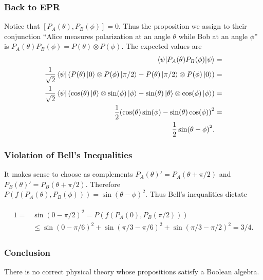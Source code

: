 \documentclass{beamer}
\begin{document}
\begin{frame}

	\frametitle{Back to EPR}
	
	Notice that $[P_A(\theta),P_B(\phi)]=0$. Thus the proposition we assign to their conjunction ``Alice measures polarization at an angle $\theta$ while Bob at an angle $\phi$'' is $P_A(\theta)P_B(\phi)=P(\theta)\otimes P(\phi)$. The expected values are
	\begin{align}
	\begin{split}
		\ev{P_A(\theta)P_B(\phi)}{\psi}&=\\
		\frac{1}{\sqrt{2}}\bra{\psi}\qty(P(\theta)\ket{0}\otimes P(\phi)\ket{\pi/2}-P(\theta)\ket{\pi/2}\otimes P(\phi)\ket{0})&=\\
		\frac{1}{\sqrt{2}}\bra{\psi}\qty(\cos(\theta)\ket{\theta}\otimes \sin(\phi)\ket{\phi}-\sin(\theta)\ket{\theta}\otimes\cos(\phi)\ket{\phi})&=\\
		\frac{1}{2}\qty(\cos(\theta)\sin(\phi)-\sin(\theta)\cos(\phi))^2&=\\
		\frac{1}{2}\sin(\theta-\phi)^2.&
	\end{split}
	\end{align}

\end{frame}

\begin{frame}

	\frametitle{Violation of Bell's Inequalities}
	
	It makes sense to choose as complements $P_A(\theta)'=P_A(\theta+\pi/2)$ and $P_B(\theta)'=P_B(\theta+\pi/2)$. Therefore $P(f(P_A(\theta),P_B(\phi)))=\sin(\theta-\phi)^2$. Thus Bell's inequalities dictate
	
	\begin{align}
	\begin{split}
	1=&\sin(0-\pi/2)^2=P(f(P_A(0),P_B(\pi/2)))\\
	&\leq\sin(0-\pi/6)^2+\sin(\pi/3-\pi/6)^2+\sin(\pi/3-\pi/2)^2=3/4.
	\end{split}
	\end{align}

\end{frame}

\begin{frame}

	\frametitle{Conclusion}
	
	\Huge There is no correct physical theory whose propositions satisfy a Boolean algebra.

\end{frame}
\end{document}
